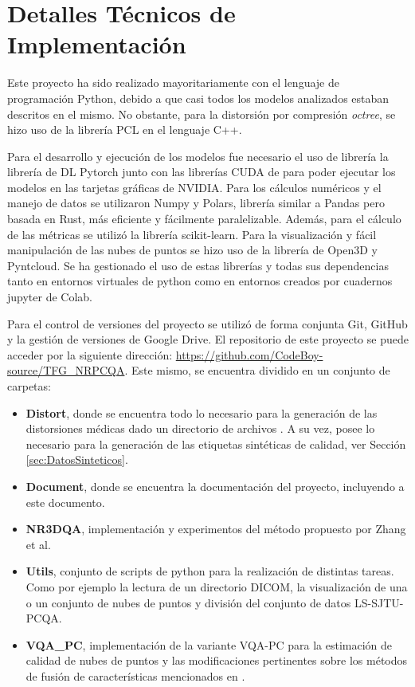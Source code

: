 \section*{Detalles Técnicos de Implementación} 
\label{sec:Implementacion}
Este proyecto ha sido realizado mayoritariamente con el lenguaje de programación Python, 
debido a que casi todos los modelos analizados estaban descritos en el mismo.
No obstante, para la distorsión por compresión \emph{octree}\cite{OctreeCompression}, 
se hizo uso de la librería PCL\cite{PCL} en el lenguaje C++.

Para el desarrollo y ejecución de los modelos fue necesario el uso de librería 
la librería de DL Pytorch junto con las librerías CUDA de para poder ejecutar 
los modelos en las tarjetas gráficas de NVIDIA. Para los cálculos numéricos y 
el manejo de datos se utilizaron Numpy y Polars, librería similar a Pandas 
pero basada en Rust, más eficiente y fácilmente paralelizable. Además, para el
cálculo de las métricas se utilizó la librería scikit-learn.
Para la visualización y fácil manipulación de las nubes de puntos se hizo uso 
de la librería de Open3D\cite{Open3D} y Pyntcloud.
Se ha gestionado el uso de estas librerías y todas sus dependencias tanto en entornos virtuales 
de python como en entornos creados por cuadernos jupyter de Colab.

Para el control de versiones del proyecto se utilizó de forma conjunta Git, GitHub
y la gestión de versiones de Google Drive. El repositorio de este proyecto se 
puede acceder por la siguiente dirección: \url{https://github.com/CodeBoy-source/TFG_NRPCQA}.
Este mismo, se encuentra dividido en un conjunto de carpetas: 
\begin{itemize}
  \item \textbf{Distort}, donde se encuentra todo lo necesario para la generación 
    de las distorsiones médicas dado un directorio de archivos . 
    A su vez, posee lo necesario para la generación de las etiquetas sintéticas 
    de calidad, ver Sección \ref{sec:DatosSinteticos}.
  \item \textbf{Document}, donde se encuentra la documentación del proyecto, 
    incluyendo a este documento. 
  \item \textbf{NR3DQA}, implementación y experimentos del método propuesto 
    por Zhang et al\cite{NR3DQA}.
  \item \textbf{Utils}, conjunto de scripts de python para la realización de distintas 
    tareas. Como por ejemplo la lectura de un directorio DICOM, la visualización 
    de una o un conjunto de nubes de puntos y división del conjunto de datos LS-SJTU-PCQA\cite{ResSCNN}.
  \item \textbf{VQA\_PC}, implementación de la variante VQA-PC\cite{VQA-PC} para 
    la estimación de calidad de nubes de puntos y las modificaciones pertinentes 
    sobre los métodos de fusión de características mencionados en \cite{EnsemblePCQA}. 
\end{itemize}
